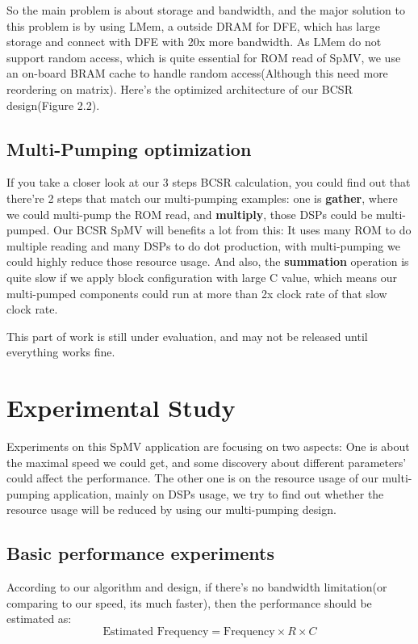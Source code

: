 \documentclass[a4paper, 10pt]{report}
\begin{document}
So the main problem is about storage and bandwidth, and the major solution to this problem is by using LMem, a outside DRAM for DFE, which has large storage and connect with DFE with 20x more bandwidth. As LMem do not support random access, which is quite essential for ROM read of SpMV, we use an on-board BRAM cache to handle random access(Although this need more reordering on matrix). Here's the optimized architecture of our BCSR design(Figure 2.2).

\subsection{Multi-Pumping optimization}
If you take a closer look at our 3 steps BCSR calculation, you could find out that there're 2 steps that match our multi-pumping examples: one is \textbf{gather}, where we could multi-pump the ROM read, and \textbf{multiply}, those DSPs could be multi-pumped. Our BCSR SpMV will benefits a lot from this: It uses many ROM to do multiple reading and many DSPs to do dot production, with multi-pumping we could highly reduce those resource usage. And also, the \textbf{summation} operation is quite slow if we apply block configuration with large C value, which means our multi-pumped components could run at more than 2x clock rate of that slow clock rate. 

This part of work is still under evaluation, and may not be released until everything works fine.

\section{Experimental Study}

Experiments on this SpMV application are focusing on two aspects: One is about the maximal speed we could get, and some discovery about different parameters' could affect the performance. The other one is on the resource usage of our multi-pumping application, mainly on DSPs usage, we try to find out whether the resource usage will be reduced by using our multi-pumping design.

\subsection{Basic performance experiments}
According to our algorithm and design, if there's no bandwidth limitation(or comparing to our speed, its much faster), then the performance should be estimated as:
$$ \text{Estimated Frequency} = \text{Frequency} \times R \times C $$
\end{document}
